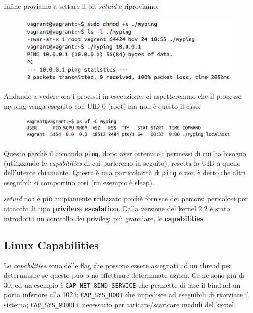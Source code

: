 Infine proviamo a settare il bit \textit{setuid} e riproviamo:

\begin{figure}[H]
    \centering
    \includegraphics[width=\textwidth, keepaspectratio]{capitoli/os_security/imgs/ping3.png}
\end{figure}

Andando a vedere ora i processi in esecuzione, ci aspetteremmo che il processo myping
venga eseguito con UID 0 (root) ma non è questo il caso.

\begin{figure}[H]
    \centering
    \includegraphics[width=\textwidth, keepaspectratio]{capitoli/os_security/imgs/ping4.png}
\end{figure}

Questo perchè il comando \verb|ping|, dopo aver ottenuto i permessi di cui ha
bisogno (utilizzando le \textit{capabilities} di cui parleremo in seguito), resetta
lo UID a quello dell'utente chiamante. Questa è una particolarità di \verb|ping|
e non è detto che altri eseguibili si comportino così (un esempio è sleep).

\textit{setuid} non è più ampiamente utilizzato poichè fornisce dei percorsi pericolosi
per attacchi di tipo \textbf{privilece escalation}. Dalla versione del kernel 2.2
è stato introdotto un controllo dei privilegi più granulare, le \textbf{capabilities}.

\subsection{Linux Capabilities}

Le \textit{capabilities} sono delle flag che possono essere assegnati ad un thread
per determinare se questo può o no effettuare determinate azioni. Ce ne sono più
di 30, ed un esempio è \verb|CAP_NET_BIND_SERVICE| che permette di fare il bind
ad un porta inferiore alla 1024; \verb|CAP_SYS_BOOT| che impedisce ad eseguibili
di riavviare il sistema; \verb|CAP_SYS_MODULE| necessario per caricare/scaricare
moduli del kernel.\\


